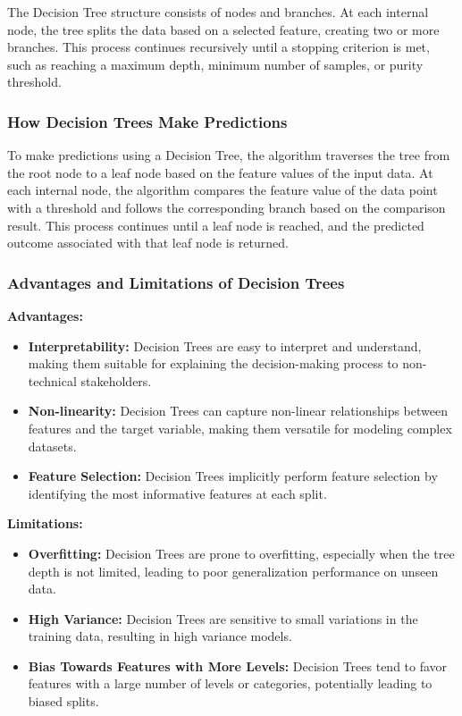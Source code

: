 \documentclass{ufazreport}
\begin{document}
The Decision Tree structure consists of nodes and branches. At each internal node, the tree splits the data based on a selected feature, creating two or more branches. This process continues recursively until a stopping criterion is met, such as reaching a maximum depth, minimum number of samples, or purity threshold.

\subsubsection{How Decision Trees Make Predictions}

To make predictions using a Decision Tree, the algorithm traverses the tree from the root node to a leaf node based on the feature values of the input data. At each internal node, the algorithm compares the feature value of the data point with a threshold and follows the corresponding branch based on the comparison result. This process continues until a leaf node is reached, and the predicted outcome associated with that leaf node is returned.

\subsubsection{Advantages and Limitations of Decision Trees}

\textbf{Advantages:}
\begin{itemize}
    \item \textbf{Interpretability:} Decision Trees are easy to interpret and understand, making them suitable for explaining the decision-making process to non-technical stakeholders.
    \item \textbf{Non-linearity:} Decision Trees can capture non-linear relationships between features and the target variable, making them versatile for modeling complex datasets.
    \item \textbf{Feature Selection:} Decision Trees implicitly perform feature selection by identifying the most informative features at each split.
\end{itemize}

\textbf{Limitations:}
\begin{itemize}
    \item \textbf{Overfitting:} Decision Trees are prone to overfitting, especially when the tree depth is not limited, leading to poor generalization performance on unseen data.
    \item \textbf{High Variance:} Decision Trees are sensitive to small variations in the training data, resulting in high variance models.
    \item \textbf{Bias Towards Features with More Levels:} Decision Trees tend to favor features with a large number of levels or categories, potentially leading to biased splits.
\end{itemize}
\end{document}
